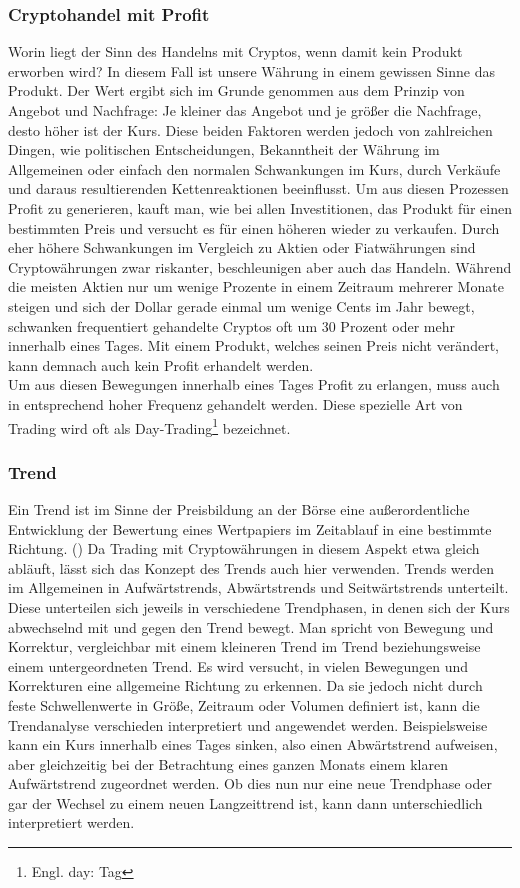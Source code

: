 \documentclass[12pt]{article}
\begin{document}
	\subsubsection{Cryptohandel mit Profit}
		Worin liegt der Sinn des Handelns mit Cryptos, wenn damit kein Produkt erworben wird? In diesem Fall ist unsere Währung in einem gewissen Sinne das Produkt. Der Wert ergibt sich im Grunde genommen aus dem Prinzip von Angebot und Nachfrage: Je kleiner das Angebot und je größer die Nachfrage, desto höher ist der Kurs. Diese beiden Faktoren werden jedoch von zahlreichen Dingen, wie politischen Entscheidungen, Bekanntheit der Währung im Allgemeinen oder einfach den normalen Schwankungen im Kurs, durch Verkäufe und daraus resultierenden Kettenreaktionen beeinflusst. Um aus diesen Prozessen Profit zu generieren, kauft man, wie bei allen Investitionen, das Produkt für einen bestimmten Preis und versucht es für einen höheren wieder zu verkaufen. Durch eher höhere Schwankungen im Vergleich zu Aktien oder Fiatwährungen sind Cryptowährungen zwar riskanter, beschleunigen aber auch das Handeln. Während die meisten Aktien nur um wenige Prozente in einem Zeitraum mehrerer Monate steigen und sich der Dollar gerade einmal um wenige Cents im Jahr bewegt, schwanken frequentiert gehandelte Cryptos oft um 30 Prozent oder mehr innerhalb eines Tages. Mit einem Produkt, welches seinen Preis nicht verändert, kann demnach auch kein Profit erhandelt werden.\\
		Um aus diesen Bewegungen innerhalb eines Tages Profit zu erlangen, muss auch in entsprechend hoher Frequenz gehandelt werden. Diese spezielle Art von Trading wird oft als Day-Trading\footnote{Engl. day: Tag} bezeichnet.
	\newpage	
	\subsubsection{Trend}
		\glqq Ein Trend ist im Sinne der Preisbildung an der Börse eine außerordentliche Entwicklung der Bewertung eines Wertpapiers im Zeitablauf in eine bestimmte Richtung\grqq{}. (\cite{WhatIsATrend}) Da Trading mit Cryptowährungen in diesem Aspekt etwa gleich abläuft, lässt sich das Konzept des Trends auch hier verwenden. Trends werden im Allgemeinen in Aufwärtstrends, Abwärtstrends und Seitwärtstrends unterteilt. Diese unterteilen sich jeweils in verschiedene Trendphasen, in denen sich der Kurs abwechselnd mit und gegen den Trend bewegt. Man spricht von Bewegung und Korrektur, vergleichbar mit einem kleineren Trend im Trend beziehungsweise einem untergeordneten Trend. Es wird versucht, in vielen Bewegungen und Korrekturen eine allgemeine Richtung zu erkennen. Da sie jedoch nicht durch feste Schwellenwerte in Größe, Zeitraum oder Volumen definiert ist, kann die Trendanalyse verschieden interpretiert und angewendet werden. Beispielsweise kann ein Kurs innerhalb eines Tages sinken, also einen Abwärtstrend aufweisen, aber gleichzeitig bei der Betrachtung eines ganzen Monats einem klaren Aufwärtstrend zugeordnet werden. Ob dies nun nur eine neue Trendphase oder gar der Wechsel zu einem neuen Langzeittrend ist, kann dann unterschiedlich interpretiert werden.
\end{document}

